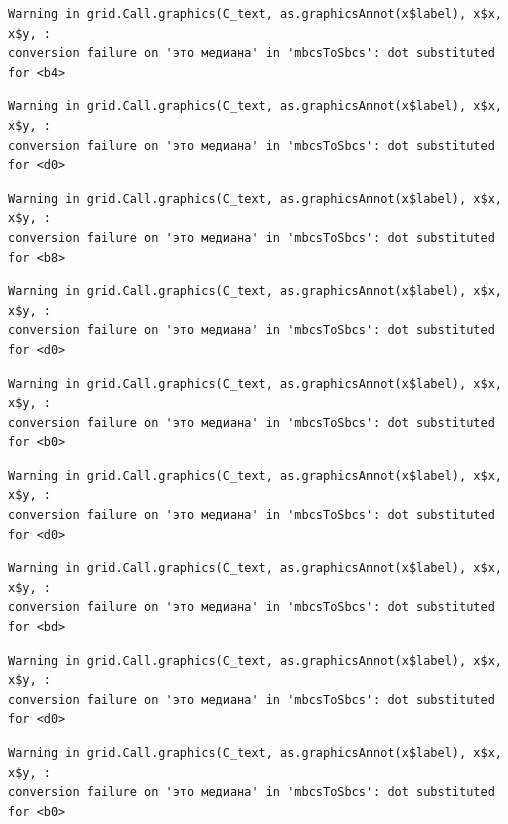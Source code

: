 \documentclass[
  letterpaper,
  DIV=11,
  numbers=noendperiod]{scrreprt}
\theoremstyle{definition}
\theoremstyle{remark}
\begin{document}
\begin{verbatim}
Warning in grid.Call.graphics(C_text, as.graphicsAnnot(x$label), x$x, x$y, :
conversion failure on 'это медиана' in 'mbcsToSbcs': dot substituted for <b4>
\end{verbatim}

\begin{verbatim}
Warning in grid.Call.graphics(C_text, as.graphicsAnnot(x$label), x$x, x$y, :
conversion failure on 'это медиана' in 'mbcsToSbcs': dot substituted for <d0>
\end{verbatim}

\begin{verbatim}
Warning in grid.Call.graphics(C_text, as.graphicsAnnot(x$label), x$x, x$y, :
conversion failure on 'это медиана' in 'mbcsToSbcs': dot substituted for <b8>
\end{verbatim}

\begin{verbatim}
Warning in grid.Call.graphics(C_text, as.graphicsAnnot(x$label), x$x, x$y, :
conversion failure on 'это медиана' in 'mbcsToSbcs': dot substituted for <d0>
\end{verbatim}

\begin{verbatim}
Warning in grid.Call.graphics(C_text, as.graphicsAnnot(x$label), x$x, x$y, :
conversion failure on 'это медиана' in 'mbcsToSbcs': dot substituted for <b0>
\end{verbatim}

\begin{verbatim}
Warning in grid.Call.graphics(C_text, as.graphicsAnnot(x$label), x$x, x$y, :
conversion failure on 'это медиана' in 'mbcsToSbcs': dot substituted for <d0>
\end{verbatim}

\begin{verbatim}
Warning in grid.Call.graphics(C_text, as.graphicsAnnot(x$label), x$x, x$y, :
conversion failure on 'это медиана' in 'mbcsToSbcs': dot substituted for <bd>
\end{verbatim}

\begin{verbatim}
Warning in grid.Call.graphics(C_text, as.graphicsAnnot(x$label), x$x, x$y, :
conversion failure on 'это медиана' in 'mbcsToSbcs': dot substituted for <d0>
\end{verbatim}

\begin{verbatim}
Warning in grid.Call.graphics(C_text, as.graphicsAnnot(x$label), x$x, x$y, :
conversion failure on 'это медиана' in 'mbcsToSbcs': dot substituted for <b0>
\end{verbatim}
\end{document}
